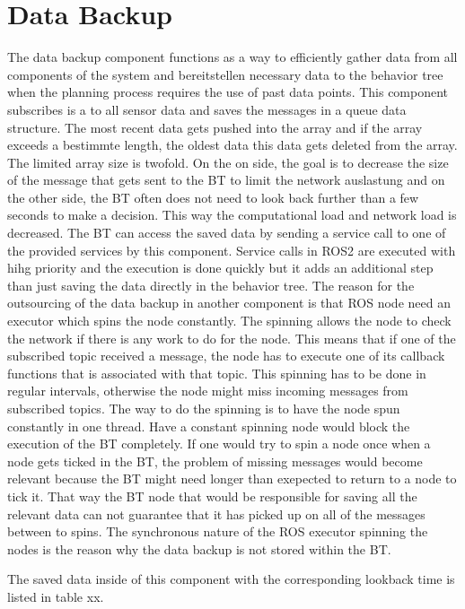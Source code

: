 \section{Data Backup}
The data backup component functions as a way to efficiently gather data from all components of the system and bereitstellen necessary data to the behavior tree when the planning process requires the use of past data points.  This component subscribes is a to all sensor data and saves the messages in a queue data structure. The most recent data gets pushed into the array and if the array exceeds a bestimmte length, the oldest data this data gets deleted from the array. The limited array size is twofold. On the on side, the goal is to decrease the size of the message that gets sent to the BT to limit the network auslastung and on the other side, the BT often does not need to look back further than a few seconds to make a decision. This way the computational load and network load is decreased.
The BT can access the saved data by sending a service call to one of the provided services by this component. Service calls in ROS2 are executed with hihg priority and the execution is done quickly but it adds an additional step than just saving the data directly in the behavior tree. The reason for the outsourcing of the data backup in another component is that ROS node need an executor which spins the node constantly. The spinning allows the node to check the network if there is any work to do for the node. This means that if one of the subscribed topic received a message, the node has to execute one of its callback functions that is associated with that topic. This spinning has to be done in regular intervals, otherwise the node might miss incoming messages from subscribed topics. The way to do the spinning is to have the node spun constantly in one thread. Have a constant spinning node would block the execution of the BT completely. If one would try to spin a node once when a node gets ticked in the BT, the problem of missing messages would become relevant because the BT might need longer than exepected to return to a node to tick it. That way the BT node that would be responsible for saving all the relevant data can not guarantee that it has picked up on all of the messages between to spins. The synchronous nature of the ROS executor spinning the nodes is the reason why the data backup is not stored within the BT. 

The saved data inside of this component with the corresponding lookback time is listed in table xx. 

